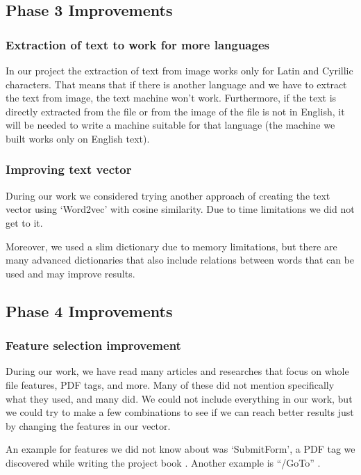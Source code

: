 \documentclass{article}
\begin{document}
\subsection{Phase 3 Improvements }
\subsubsection{Extraction of text to work for more languages}
\indent In our project the extraction of text from image works only for Latin and Cyrillic characters. That means that if there is another language and we have to extract the text from image, the text machine won't work. Furthermore, if the text is directly extracted from the file or from the image of the file is not in English, it will be needed to write a machine suitable for that language (the machine we built works only on English text).

\subsubsection{Improving text vector}
\indent During our work we considered trying another approach of creating the text vector using ‘Word2vec’ with cosine similarity. Due to time limitations we did not get to it.

\indent Moreover, we used a slim dictionary due to memory limitations, but there are many advanced dictionaries that also include relations between words that can be used and may improve results.

\subsection{Phase 4 Improvements} 
\subsubsection{Feature selection improvement}
\indent During our work, we have read many articles and researches that focus on whole file features, PDF tags, and more. Many of these did not mention specifically what they used, and many did. We could not include everything in our work, but we could try to make a few combinations to see if we can reach better results just by changing the features in our vector. 

\indent An example for features we did not know about was ‘SubmitForm’, a PDF tag we discovered while writing the project book \cite{Hamon2013malicious}. Another example is “/GoTo” \cite{BGU2014malicious}.
\end{document}
